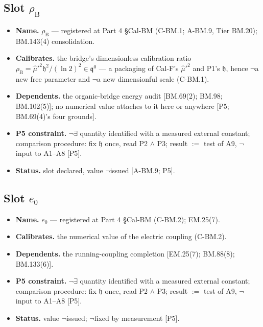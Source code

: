 \documentclass[11pt,openany]{report}
\theoremstyle{canonplain}
\theoremstyle{canondef}
\begin{document}
\subsection*{Slot $\rho_{\mathrm B}$}
\begin{itemize}\setlength{\itemsep}{2pt}
\item \textbf{Name.} $\rho_{\mathrm B}$ — registered at Part 4 §Cal-BM (C-BM.1; A-BM.9, Tier BM.20); BM.143(4) consolidation.
\item \textbf{Calibrates.} the bridge's dimensionless calibration ratio $\rho_{\mathrm B}=\hat\mu'^2\mathfrak h^2/(\ln2)^2\in\mathfrak q^0$ — a packaging of Cal-F's $\hat\mu'^2$ and P1's $\mathfrak h$, hence $\neg$a new free parameter and $\neg$a new dimensionful scale (C-BM.1).
\item \textbf{Dependents.} the organic-bridge energy audit [BM.69(2); BM.98; BM.102(5)]; no numerical value attaches to it here or anywhere [P5; BM.69(4)'s four grounds].
\item \textbf{P5 constraint.} $\neg\exists$ quantity identified with a measured external constant; comparison procedure: fix $\mathfrak h$ once, read P2 $\wedge$ P3; result $:=$ test of A9, $\neg$ input to A1--A8 [P5].
\item \textbf{Status.} slot declared, value $\neg$issued [A-BM.9; P5].
\end{itemize}
\subsection*{Slot $e_0$}
\begin{itemize}\setlength{\itemsep}{2pt}
\item \textbf{Name.} $e_0$ — registered at Part 4 §Cal-BM (C-BM.2); EM.25(7).
\item \textbf{Calibrates.} the numerical value of the electric coupling (C-BM.2).
\item \textbf{Dependents.} the running-coupling completion [EM.25(7); BM.88(8); BM.133(6)].
\item \textbf{P5 constraint.} $\neg\exists$ quantity identified with a measured external constant; comparison procedure: fix $\mathfrak h$ once, read P2 $\wedge$ P3; result $:=$ test of A9, $\neg$ input to A1--A8 [P5].
\item \textbf{Status.} value $\neg$issued; $\neg$fixed by measurement [P5].
\end{itemize}
\end{document}
